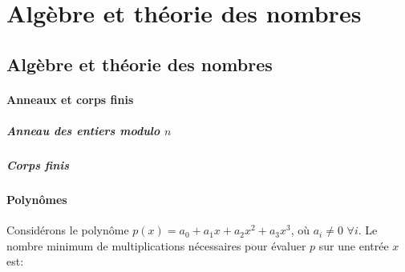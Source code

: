 \part{Algèbre et théorie des nombres}
\chapter{Algèbre et théorie des nombres}
\subsection{Anneaux et corps finis}
\subsubsection{ Anneau des entiers modulo $n$}
\subsubsection{ Corps finis}
\subsection{Polynômes}
\begin{exercise}
Considérons le polynôme $p(x) = a_{0} + a_{1} x + a_{2} x^{2} + a_{3} x^{3}$, où $a_{i} \neq 0$ $\forall i$. Le nombre minimum de multiplications nécessaires pour évaluer $p$ sur une entrée $x$ est:
\end{exercise}